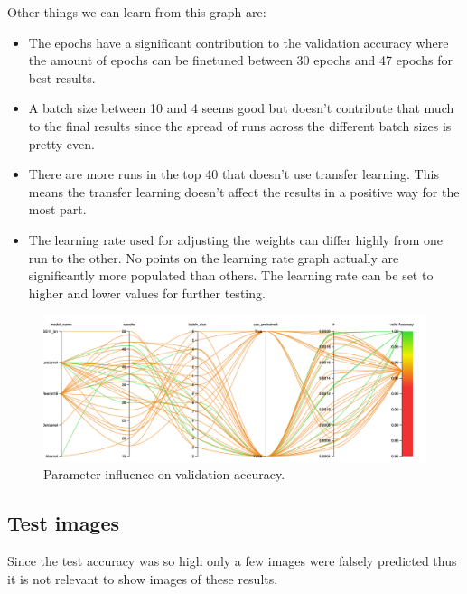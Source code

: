 Other things we can learn from this graph are:
	\begin{itemize}
		\item  The epochs have a significant contribution to the validation accuracy where the amount of epochs can be finetuned between 30 epochs and 47 epochs for best results.
		\item A batch size between 10 and 4 seems good but doesn't contribute that much to the final results since the spread of runs across the different batch sizes is pretty even.
		\item There are more runs in the top 40 that doesn't use transfer learning. This means the transfer learning doesn't affect the results in a positive way for the most part.
		\item The learning rate used for adjusting the weights can differ highly from one run to the other. No points on the learning rate graph actually are significantly more populated than others. The learning rate can be set to higher and lower values for further testing.
	\end{itemize}


	\begin{figure}[hbtp]
		\centering
		\includegraphics[width=\textwidth]{fig/results/wandb/second_handmade_sweep/charts/Section-21-Panel-0-xfrvxv29l.png}
		\caption{Parameter influence on validation accuracy.}
		\label{fig:res:shm:params}
	\end{figure}

\subsection{Test images}
Since the test accuracy was so high only a few images were falsely predicted thus it is not relevant to show images of these results.

